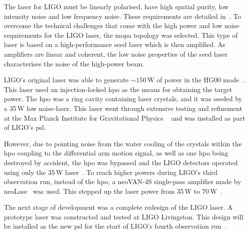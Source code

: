\par
The laser for LIGO must be linearly polarised, have high spatial purity, low intensity noise and low frequency noise. These requirements are detailed in~\cite{PSL_requirements}. To overcome the technical challenges that come with the high power and low noise requirements for the LIGO laser, the \gls{mopa} topology was selected. This type of laser is based on a high-performance seed laser which is then amplified. As amplifiers are linear and coherent, the low noise properties of the seed laser characterises the noise of the high-power beam.
\par
LIGO's original laser was able to generate $\sim\!150\,\si{\watt}$ of power in the HG00 mode~\cite{Kwee2012}. This laser used an injection-locked \gls{hpo} as the means for obtaining the target power. The \gls{hpo} was a ring cavity containing laser crystals, and it was seeded by a 35\,\si{\watt} low noise-laser. This laser went through extensive testing and refinement at the Max Planck Institute for Gravitational Physics ~\cite{Kwee2012} and was installed as part of LIGO's \gls{psl}. 
\par
However, due to pointing noise from the water cooling of the crystals within the \gls{hpo} coupling to the differential arm motion signal, as well as one \gls{hpo} being destroyed by accident, the \gls{hpo} was bypassed and the LIGO detectors operated using only the 35\,\si{\watt} laser~\cite{InstrumentWhitePaper2019}. To reach higher powers during LIGO's third observation run, instead of the \gls{hpo}, a neoVAN-4S single-pass amplifier made by neoLase~\cite{neolase} was used. This stepped up the laser power from 35\,\si{\watt} to 70\,\si{\watt}~\cite{spencer_thesis,Buikema2020}. 
\par
The next stage of development was a complete redesign of the LIGO laser. A prototype laser was constructed and tested at LIGO Livingston. This design will be installed as the new \gls{psl} for the start of LIGO's fourth observation run~\cite{InstrumentWhitePaper2019}.
